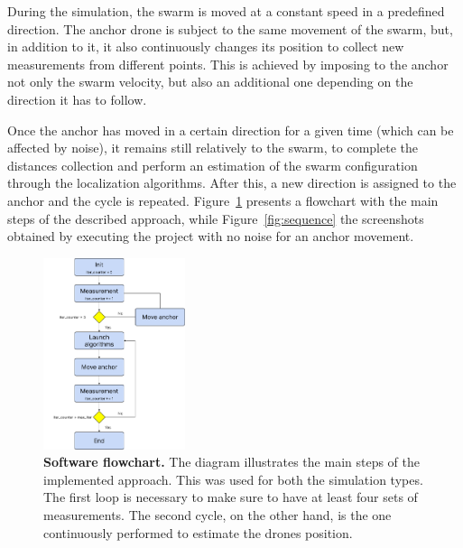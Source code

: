 During the simulation, the swarm is moved at a constant speed in a predefined direction. 
The anchor drone is subject to the same movement of the swarm, but, in addition to it, it also continuously changes its position to collect new measurements from different points.
This is achieved by imposing to the anchor not only the swarm velocity, but also an additional one depending on the direction it has to follow. \par

Once the anchor has moved in a certain direction for a given time (which can be affected by noise), it remains still relatively to the swarm, to complete the distances collection and perform an estimation of the swarm configuration through the localization algorithms.
After this, a new direction is assigned to the anchor and the cycle is repeated. Figure~\ref{fig:flowchart} presents a flowchart with the main steps of the described approach, while Figure~\ref{fig:sequence} the screenshots obtained by executing the project with no noise for an anchor movement.

\begin{figure}[!ht]
  \begin{center}
    \includegraphics[width=0.37\textwidth]{figures/flowchart_color.pdf}
  \end{center}
  \caption[Software flowchart]{
    \textbf{Software flowchart.} 
    The diagram illustrates the main steps of the implemented approach. This was used for both the simulation types. The first loop is necessary to make sure to have at least four sets of measurements. The second cycle, on the other hand, is the one continuously performed to estimate the drones position.
  }
  \label{fig:flowchart}
\end{figure}


